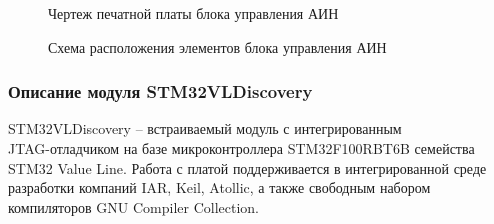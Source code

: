         \begin{figure}[h!]
            \caption{Чертеж печатной платы блока управления АИН}
            \label{fig:control-board-route}
        \end{figure}

        \begin{figure}[h!]
            \caption{Схема расположения элементов блока управления АИН}
            \label{fig:control-board-place}
        \end{figure}

        
    \subsubsection{Описание модуля STM32VLDiscovery}
        STM32VLDiscovery -- встраиваемый модуль с интегрированным\\
        JTAG-отладчиком на базе микроконтроллера STM32F100RBT6B семейства STM32
        Value Line. Работа с платой поддерживается в интегрированной среде
        разработки компаний IAR, Keil, Atollic, а также свободным набором
        компиляторов GNU Compiler Collection.


